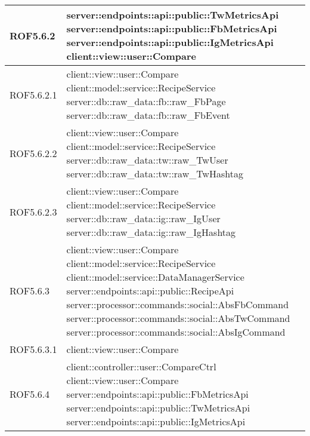 \begin{center}
\begin{longtable}{| p{2.5cm} | p{11cm} |}
\hline
ROF5.6.2 & server::endpoints::api::public::TwMetricsApi \newline server::endpoints::api::public::FbMetricsApi \newline server::endpoints::api::public::IgMetricsApi \newline client::view::user::Compare \\
\hline
ROF5.6.2.1 & client::view::user::Compare \newline client::model::service::RecipeService \newline server::db::raw\_data::fb::raw\_FbPage \newline server::db::raw\_data::fb::raw\_FbEvent \\
\hline
ROF5.6.2.2 & client::view::user::Compare \newline client::model::service::RecipeService \newline server::db::raw\_data::tw::raw\_TwUser \newline server::db::raw\_data::tw::raw\_TwHashtag \\
\hline
ROF5.6.2.3 & client::view::user::Compare \newline client::model::service::RecipeService \newline server::db::raw\_data::ig::raw\_IgUser \newline server::db::raw\_data::ig::raw\_IgHashtag \\
\hline
ROF5.6.3 & client::view::user::Compare \newline client::model::service::RecipeService \newline client::model::service::DataManagerService \newline server::endpoints::api::public::RecipeApi \newline server::processor::commands::social::AbsFbCommand \newline server::processor::commands::social::AbsTwCommand \newline server::processor::commands::social::AbsIgCommand\\
\hline
ROF5.6.3.1 & client::view::user::Compare \\
\hline
ROF5.6.4 & client::controller::user::CompareCtrl \newline client::view::user::Compare \newline server::endpoints::api::public::FbMetricsApi \newline server::endpoints::api::public::TwMetricsApi \newline server::endpoints::api::public::IgMetricsApi \\

\end{longtable}
\end{center}
